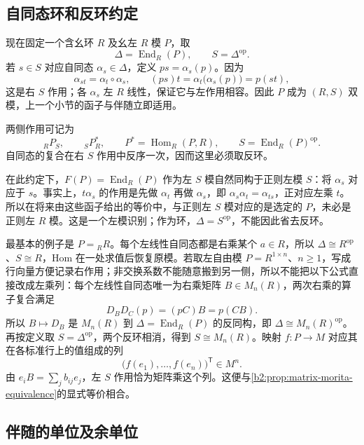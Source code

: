 \subsection{自同态环和反环约定}
\label{b2:subsec:1602:02}

现在固定一个含幺环 \(R\) 及幺左 \(R\) 模 \(P\)，取
\[
	\Delta=\operatorname{End}_R(P),\qquad S=\Delta^{\mathrm{op}}.
\]
若 \(s\in S\) 对应自同态 \(\alpha_s\in\Delta\)，定义 \(ps=\alpha_s(p)\)。因为
\[
	\alpha_{st}=\alpha_t\circ\alpha_s, \qquad (ps)t=\alpha_t\bigl(\alpha_s(p)\bigr)=p(st),
\]
这是右 \(S\) 作用；各 \(\alpha_s\) 左 \(R\) 线性，保证它与左作用相容。因此 \(P\) 成为 \((R,S)\) 双模，上一个小节的函子与伴随立即适用。

两侧作用可记为
\[
	{}_RP_S,\qquad {}_SP^*_R,\qquad P^*=\operatorname{Hom}_R(P,R),\qquad S=\operatorname{End}_R(P)^{\mathrm{op}}.
\]
自同态的复合在右 \(S\) 作用中反序一次，因而这里必须取反环。

\ProseParagraphBreak
在此约定下，\(F(P)=\operatorname{End}_R(P)\) 作为左 \(S\) 模自然同构于正则左模 \(S\)：将 \(\alpha_s\) 对应于 \(s\)。事实上，\(t\alpha_s\) 的作用是先做 \(\alpha_t\) 再做 \(\alpha_s\)，即 \(\alpha_s\alpha_t=\alpha_{ts}\)，正对应左乘 \(t\)。所以在将来由这些函子给出的等价中，与正则左 \(S\) 模对应的是选定的 \(P\)，未必是正则左 \(R\) 模。这是一个左模识别；作为环，\(\Delta=S^{\mathrm{op}}\)，不能因此省去反环。

\ProseParagraphBreak
最基本的例子是 \(P={}_RR\)。每个左线性自同态都是右乘某个 \(a\in R\)，所以 \(\Delta\cong R^{\mathrm{op}}\)、\(S\cong R\)，Hom 在一处求值后恢复原模。若取左自由模 \(P=R^{1\times n}\)、\(n\ge1\)，写成行向量方便记录右作用；非交换系数不能随意搬到另一侧，所以不能把以下公式直接改成左乘列：每个左线性自同态唯一为右乘矩阵 \(B\in M_n(R)\)，两次右乘的算子复合满足
\[
	D_BD_C(p)=(pC)B=p(CB).
\]
所以 \(B\mapsto D_B\) 是 \(M_n(R)\) 到 \(\Delta=\operatorname{End}_R(P)\) 的反同构，即 \(\Delta\cong M_n(R)^{\mathrm{op}}\)。再按定义取 \(S=\Delta^{\mathrm{op}}\)，两个反环相消，得到 \(S\cong M_n(R)\)。映射 \(f:P\rightarrow M\) 对应其在各标准行上的值组成的列
\[
	\bigl(f(e_1),\ldots,f(e_n)\bigr)^{\mathsf T}\in M^n.
\]
由 \(e_iB=\sum_j b_{ij}e_j\)，左 \(S\) 作用恰为矩阵乘这个列。这便与\cref{b2:prop:matrix-morita-equivalence}的显式等价相合。

\subsection{伴随的单位及余单位}
\label{b2:subsec:1602:03}


